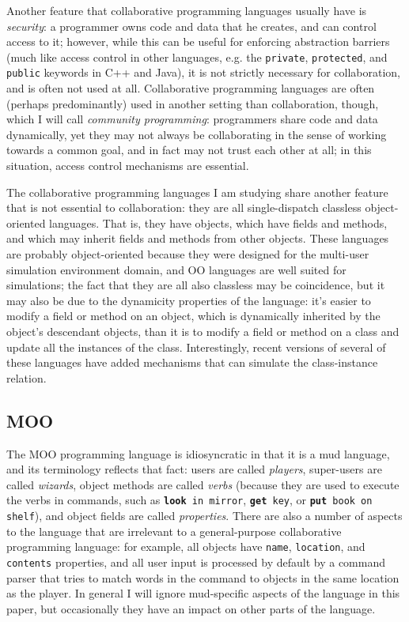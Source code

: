 \documentclass{article}
\begin{document}
Another feature that collaborative programming languages usually have
is \emph{security}: a programmer owns code and data that he creates, and can
control access to it; however, while this can be useful for enforcing
abstraction barriers (much like access control in other languages,
e.g. the \texttt{private}, \texttt{protected}, and \texttt{public}
keywords in C++\cite{ARM} and Java), it is not strictly necessary for
collaboration, and is often not used at all.  Collaborative
programming languages are often (perhaps predominantly) used in
another setting than collaboration, though, which I will call
\emph{community programming}: programmers share code and data dynamically,
yet they may not always be collaborating in the sense of working
towards a common goal, and in fact may not trust each other at all; in
this situation, access control mechanisms are essential.

The collaborative programming languages I am studying share another
feature that is not essential to collaboration: they are all
single-dispatch classless object-oriented languages.  That is, they
have objects, which have fields and methods, and which may inherit
fields and methods from other objects.  These languages are probably
object-oriented because they were designed for the multi-user
simulation environment domain, and OO languages are well suited for
simulations; the fact that they are all also classless may be
coincidence, but it may also be due to the dynamicity properties of
the language: it's easier to modify a field or method on an object,
which is dynamically inherited by the object's descendant objects,
than it is to modify a field or method on a class and update all the
instances of the class.  Interestingly, recent versions of several of
these languages have added mechanisms that can simulate the
class-instance relation.

\subsection{MOO}

The MOO programming language is idiosyncratic in that it is a mud
language, and its terminology reflects that fact: users are called
\emph{players}, super-users are called \emph{wizards}, object
methods are called \emph{verbs} (because they are used to execute
the verbs in commands, such as \texttt{{\ttfamily\bfseries look} in
mirror}, \texttt{\textbf{get} key}, or \texttt{\textbf{put} book on
shelf}), and object fields are called \emph{properties}.  There are
also a number of aspects to the language that are irrelevant to a
general-purpose collaborative programming language: for example, all
objects have \texttt{name}, \texttt{location}, and \texttt{contents}
properties, and all user input is processed by default by a command
parser that tries to match words in the command to objects in the same
location as the player.  In general I will ignore mud-specific aspects
of the language in this paper, but occasionally they have an impact on
other parts of the language.
\end{document}
